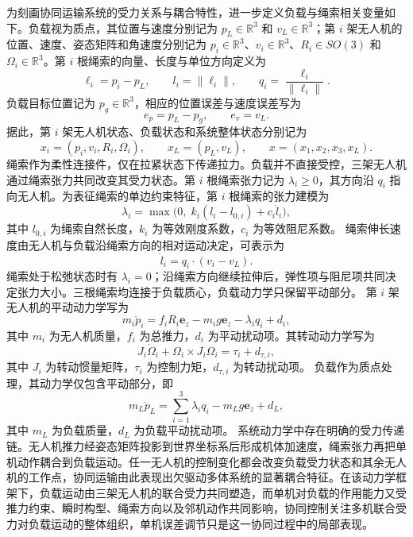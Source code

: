 为刻画协同运输系统的受力关系与耦合特性，进一步定义负载与绳索相关变量如下。负载视为质点，其位置与速度分别记为 $p_L\in\mathbb R^3$ 和 $v_L\in\mathbb R^3$；第 $i$ 架无人机的位置、速度、姿态矩阵和角速度分别记为 $p_i\in\mathbb R^3$、$v_i\in\mathbb R^3$、$R_i\in SO(3)$ 和 $\Omega_i\in\mathbb R^3$。第 $i$ 根绳索的向量、长度与单位方向定义为
\begin{equation}
    \ell_i = p_i - p_L,\qquad
    l_i = \|\ell_i\|,\qquad
    q_i = \frac{\ell_i}{\|\ell_i\|}.
\end{equation}
负载目标位置记为 $p_g\in\mathbb R^3$，相应的位置误差与速度误差写为
\begin{equation}
    e_p = p_L - p_g,\qquad
    e_v = v_L.
\end{equation}
据此，第 $i$ 架无人机状态、负载状态和系统整体状态分别记为
\begin{equation}
    x_i = (p_i,v_i,R_i,\Omega_i),\qquad
    x_L = (p_L,v_L),\qquad
    x = (x_1,x_2,x_3,x_L).
\end{equation}
绳索作为柔性连接件，仅在拉紧状态下传递拉力。负载并不直接受控，三架无人机通过绳索张力共同改变其受力状态。第 $i$ 根绳索张力记为 $\lambda_i\ge 0$，其方向沿 $q_i$ 指向无人机。为表征绳索的单边约束特征，第 $i$ 根绳索的张力建模为
\begin{equation}
    \lambda_i = \max\Big(0,\; k_i(l_i-l_{0,i}) + c_i\dot l_i\Big),
\end{equation}
其中 $l_{0,i}$ 为绳索自然长度，$k_i$ 为等效刚度系数，$c_i$ 为等效阻尼系数。
绳索伸长速度由无人机与负载沿绳索方向的相对运动决定，可表示为
\begin{equation}
    \dot l_i = q_i \cdot (v_i-v_L).
\end{equation}
绳索处于松弛状态时有 $\lambda_i=0$；沿绳索方向继续拉伸后，弹性项与阻尼项共同决定张力大小。三根绳索均连接于负载质心，负载动力学只保留平动部分。
第 $i$ 架无人机的平动动力学写为
\begin{equation}
    m_i\ddot p_i = f_i R_i \mathbf e_z - m_i g\mathbf e_z - \lambda_i q_i + d_i,
\end{equation}
其中 $m_i$ 为无人机质量，$f_i$ 为总推力，$d_i$ 为平动扰动项。其转动动力学写为
\begin{equation}
    J_i\dot \Omega_i + \Omega_i \times J_i\Omega_i = \tau_i + d_{\tau,i},
\end{equation}
其中 $J_i$ 为转动惯量矩阵，$\tau_i$ 为控制力矩，$d_{\tau,i}$ 为转动扰动项。
负载作为质点处理，其动力学仅包含平动部分，即
\begin{equation}
    m_L \ddot p_L = \sum_{i=1}^{3}\lambda_i q_i - m_L g\mathbf e_z + d_L,
\end{equation}
其中 $m_L$ 为负载质量，$d_L$ 为负载平动扰动项。
系统动力学中存在明确的受力传递链。无人机推力经姿态矩阵投影到世界坐标系后形成机体加速度，绳索张力再把单机动作耦合到负载运动。任一无人机的控制变化都会改变负载受力状态和其余无人机的工作点，协同运输由此表现出欠驱动多体系统的显著耦合特征。在该动力学框架下，负载运动由三架无人机的联合受力共同塑造，而单机对负载的作用能力又受推力约束、瞬时构型、绳索方向以及邻机动作共同影响，协同控制关注多机联合受力对负载运动的整体组织，单机误差调节只是这一协同过程中的局部表现。

